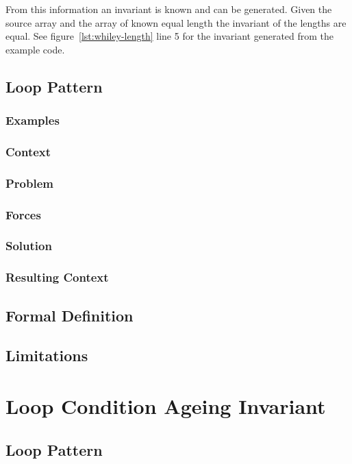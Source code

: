 From this information an invariant is known and can be generated.
Given the source array and the array of known equal length the
invariant of the lengths are equal.
See figure~\ref{lst:whiley-length} line 5 for the invariant generated
from the example code.

\subsection{Loop Pattern}

\subsubsection{Examples}
\subsubsection{Context}
\subsubsection{Problem}
\subsubsection{Forces}
\subsubsection{Solution}
\subsubsection{Resulting Context}

\subsection{Formal Definition}

\subsection{Limitations}

\section{Loop Condition Ageing Invariant}

\subsection{Loop Pattern}

